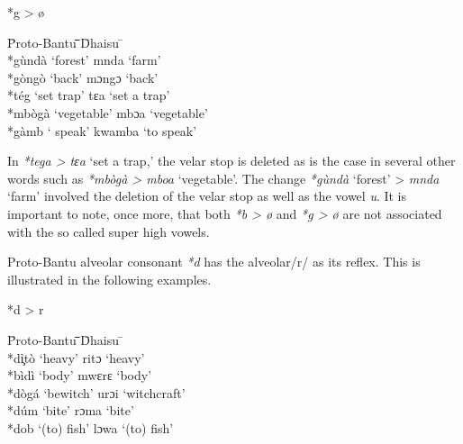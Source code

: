 \documentclass[output=paper,colorlinks,citecolor=brown]{langscibook}
\begin{document}
\ea%
    \label{ex:ngonyani:7}
    *g > ø\\
	\begin{tabbing} 
        \= Proto-Bantu \quad\= \quad\= \quad\= \quad\= \quad\= \quad\= \quad\= Dhaisu \quad\=  \quad\= \\
        \> *gùndà
        \> ‘forest’\> \> \>  \> \> \> 
        mnda
        \> ‘farm’\\
        \> *gòngò
        \> ‘back’ \> \> \>  \> \> \> 
        mɔngɔ
        \> ‘back’\\
        \> *tég
        \> ‘set trap’\> \> \>  \> \> \> 
        tɛa
        \> ‘set a trap’\\
        \> *mbògà
        \> ‘vegetable’\> \> \>  \> \> \> 
        mbɔa
        \> ‘vegetable’\\
        \> *gàmb
        ‘\> speak’\> \> \>  \> \> \> 
        kwamba
        \> ‘to speak’
   \end{tabbing}
\z

In \textit{*tega > tɛa} ‘set a trap,’ the velar stop is deleted as is the case in several other words such as \textit{*mbògà > mboa} ‘vegetable’. The change \textit{*gùndà} ‘forest’ > \textit{mnda} ‘farm’ involved the deletion of the velar stop as well as the vowel \textit{u}. It is important to note, once more, that both \textit{*b > ø} and \textit{*g > ø} are not associated with the so called super high vowels. 

Proto-Bantu alveolar consonant \textit{*d} has the alveolar/r/ as its reflex. This is illustrated in the following examples. 

\ea%
    \label{ex:ngonyani:8}
    *d > r\\
    \begin{tabbing} 
        \= Proto-Bantu \quad\= \quad\= \quad\= \quad\= \quad\= \quad\= \quad\= Dhaisu \quad\=  \quad\= \\
        \> *dì̧tò
        \> ‘heavy’
        \> \> \>  \> \> \> ritɔ
        \> ‘heavy’\\
        
        \> *bìdì
        \> ‘body’
        \> \> \>  \> \> \> mwɛrɛ
        \> ‘body’\\
        
        \> *dògá
        \> ‘bewitch’
        \> \> \>  \> \> \> urɔi
        \> ‘witchcraft’\\
        
        \> *dúm
        \> ‘bite’
        \> \> \>  \> \> \> rɔma
        \> ‘bite’\\
        
        \> *dob
        \> ‘(to) fish’
        \> \> \>  \> \> \> lɔwa
        \> ‘(to) fish’
   \end{tabbing}
\z
\end{document}
